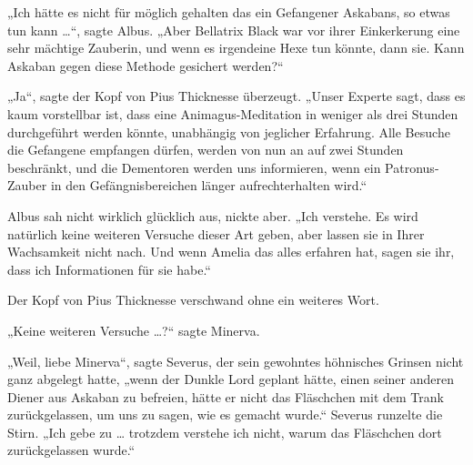 „Ich hätte es nicht für möglich gehalten das ein Gefangener Askabans, so etwas tun kann …“, sagte Albus.
„Aber Bellatrix Black war vor ihrer Einkerkerung eine sehr mächtige Zauberin, und wenn es irgendeine Hexe tun könnte, dann sie. Kann Askaban gegen diese Methode gesichert werden?“

„Ja“, sagte der Kopf von Pius Thicknesse überzeugt.
„Unser Experte sagt, dass es kaum vorstellbar ist, dass eine Animagus-Meditation in weniger als drei Stunden durchgeführt werden könnte, unabhängig von jeglicher Erfahrung. Alle Besuche die Gefangene empfangen dürfen, werden von nun an auf zwei Stunden beschränkt, und die Dementoren werden uns informieren, wenn ein Patronus-Zauber in den Gefängnisbereichen länger aufrechterhalten wird.“

Albus sah nicht wirklich glücklich aus, nickte aber.
„Ich verstehe. Es wird natürlich keine weiteren Versuche dieser Art geben, aber lassen sie in Ihrer Wachsamkeit nicht nach. Und wenn Amelia das alles erfahren hat, sagen sie ihr, dass ich Informationen für sie habe.“

Der Kopf von Pius Thicknesse verschwand ohne ein weiteres Wort.

„Keine weiteren Versuche …?“ sagte Minerva.

„Weil, liebe Minerva“, sagte Severus, der sein gewohntes höhnisches Grinsen nicht ganz abgelegt hatte, „wenn der Dunkle Lord geplant hätte, einen seiner anderen Diener aus Askaban zu befreien, hätte er nicht das Fläschchen mit dem Trank zurückgelassen, um uns zu sagen, wie es gemacht wurde.“ Severus runzelte die Stirn.
„Ich gebe zu … trotzdem verstehe ich nicht, warum das Fläschchen dort zurückgelassen wurde.“

